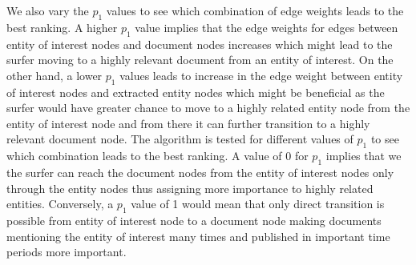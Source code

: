 We also vary the $p_1$ values to see which combination of edge weights leads to
the best ranking.
A higher $p_1$ value implies that the edge weights for edges between
entity of interest nodes and document nodes increases which might lead to the
surfer moving to a highly relevant document from an entity of interest.
On the other hand, a lower $p_1$ values leads to increase in the edge weight
between entity of interest nodes and extracted entity nodes
which might be beneficial
as the surfer would have greater chance to move to a highly
related entity node from the
entity of interest node and from there it can further transition to
a highly relevant document node.
The algorithm is tested for different values of $p_1$ to see which
combination leads to the best ranking.
A value of 0 for $p_1$ implies that we the surfer can reach the
document nodes from the entity of interest
nodes only through the entity nodes thus assigning more importance
to highly related entities.
Conversely, a $p_1$ value of 1 would mean that only direct transition is possible from
entity of interest node to a document node making documents
mentioning the entity of interest many times
and published in important time periods more important.